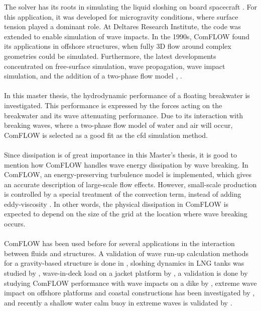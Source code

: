 The solver has its roots in simulating the liquid sloshing on board spacecraft \parencite{veldman1984axisymmetric}. For this application, it was developed for microgravity conditions, where surface tension played a dominant role. At Deltares Research Institute, the code was extended to enable simulation of wave impacts. In the 1990s, ComFLOW found its applications in offshore structures, when fully 3D flow around complex geometries could be simulated. Furthermore, the latest developments concentrated on free-surface simulation, wave propagation, wave impact simulation, and the addition of a two-phase flow model \parencite{Kleefsman2005}, \parencite{Wemmenhove2008}. \\
\\
In this master thesis, the hydrodynamic performance of a floating breakwater is investigated. This performance is expressed by the forces acting on the breakwater and its wave attenuating performance. Due to its interaction with breaking waves, where a two-phase flow model of water and air will occur, ComFLOW is selected as a good fit as the \acrshort{cfd} simulation method. \\
\\
Since dissipation is of great importance in this Master's thesis, it is good to mention how ComFLOW handles wave energy dissipation by wave breaking. In ComFLOW, an energy-preserving turbulence model is implemented, which gives an accurate description of large-scale flow effects. However, small-scale production is controlled by a special treatment of the convection term, instead of adding eddy-viscosity \parencite{Luppes2013}. In other words, the physical dissipation in ComFLOW is expected to depend on the size of the grid at the location where wave breaking occurs. \\
\\

ComFLOW has been used before for several applications in the interaction between fluids and structures. A validation of wave run-up calculation methods for a gravity-based structure is done in \citet{Danmeier2008}, sloshing dynamics in LNG tanks was studied by \citet{Wemmenhove2009}, wave-in-deck load on a jacket platform by \citet{Iwanowski2009}, a validation is done by studying ComFLOW performance with wave impacts on a dike by \citet{Wenneker2010}, extreme wave impact on offshore platforms and coastal constructions has been investigated by \citet{Luppes2011}, and recently a shallow water \acrfull{calm} buoy in extreme waves is validated by \citet{Bandringa2021}. 



